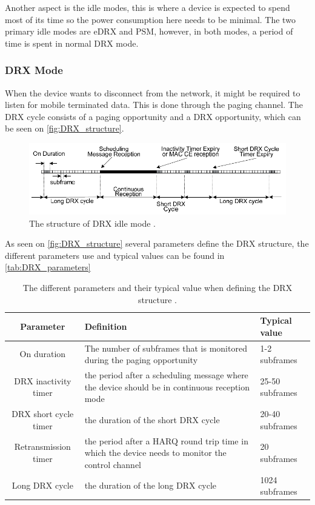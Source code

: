 Another aspect is the idle modes, this is where a device is expected to spend most of its time so the power consumption here needs to be minimal. The two primary idle modes are \gls{eDRX} and \gls{PSM}, however, in both modes, a period of time is spent in normal DRX mode. 


\subsubsection{DRX Mode}
When the device wants to disconnect from the network, it might be required to listen for mobile terminated data. This is done through the paging channel. The DRX cycle consists of a paging opportunity and a DRX opportunity, which can be seen on \autoref{fig:DRX_structure}. 

\begin{figure}[H]
\centering
\includegraphics[width=\textwidth]{figures/DRX_structure.pdf}
\caption{The structure of \gls{DRX} idle mode \citep{book_LTE_for_UMTS2}.}
\label{fig:DRX_structure}
\end{figure}

As seen on \autoref{fig:DRX_structure} several parameters define the DRX structure, the different parameters use and typical values can be found in \autoref{tab:DRX_parameters}

\begin{table}[H]
\centering
\begin{tabular}{|c|p{6cm}|p{4cm}|} \hline
\textbf{Parameter} & \textbf{Definition} & \textbf{Typical value} \\ \hline 
On duration &  The number of subframes that is monitored during the paging opportunity & 1-2 subframes\\ \hline
DRX inactivity timer & the period after a scheduling message where the device should be in continuous reception mode & 25-50 subframes \\ \hline
DRX short cycle timer & the duration of the short DRX cycle & 20-40 subframes \\ \hline
Retransmission timer & the period after a \gls{HARQ} round trip time in which the device needs to monitor the control channel & 20  subframes \\ \hline
Long DRX cycle & the duration of the long DRX cycle & 1024 subframes \\ \hline
\end{tabular}
\caption{The different parameters and their typical value when defining the DRX structure \citep{book_LTE_for_UMTS}.}
\label{tab:DRX_parameters}
\end{table}

